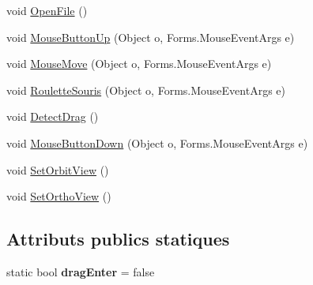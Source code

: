 \begin{DoxyCompactItemize}
\item 
void \hyperlink{class_interface_graphique_1_1_simulator_controller_a299c58492b20501c236282e5b46bf46d}{Open\-File} ()
\item 
void \hyperlink{class_interface_graphique_1_1_simulator_controller_ad86f37e170b5cb3e0ae7a39580036bbe}{Mouse\-Button\-Up} (Object o, Forms.\-Mouse\-Event\-Args e)
\item 
void \hyperlink{class_interface_graphique_1_1_simulator_controller_a7b15573e22623a2b8a81a9f3e623223d}{Mouse\-Move} (Object o, Forms.\-Mouse\-Event\-Args e)
\item 
void \hyperlink{class_interface_graphique_1_1_simulator_controller_a40612f5e81e728dd7b326c7a271f6dfd}{Roulette\-Souris} (Object o, Forms.\-Mouse\-Event\-Args e)
\item 
void \hyperlink{class_interface_graphique_1_1_simulator_controller_a95cf429913059a3767819ca438edd462}{Detect\-Drag} ()
\item 
void \hyperlink{class_interface_graphique_1_1_simulator_controller_afb7144bb012d9996f6c098652d2cb91f}{Mouse\-Button\-Down} (Object o, Forms.\-Mouse\-Event\-Args e)
\item 
void \hyperlink{class_interface_graphique_1_1_simulator_controller_adb4ab692c82be8407a4381c98470b05b}{Set\-Orbit\-View} ()
\item 
void \hyperlink{class_interface_graphique_1_1_simulator_controller_aa8fcfdca73946f1dedca90e828612615}{Set\-Ortho\-View} ()
\end{DoxyCompactItemize}
\subsection*{Attributs publics statiques}
\begin{DoxyCompactItemize}
\item 
\hypertarget{class_interface_graphique_1_1_simulator_controller_afacbc3eb21e39faa3cc5e2659f25c926}{static bool {\bfseries drag\-Enter} = false}\label{class_interface_graphique_1_1_simulator_controller_afacbc3eb21e39faa3cc5e2659f25c926}

\end{DoxyCompactItemize}


